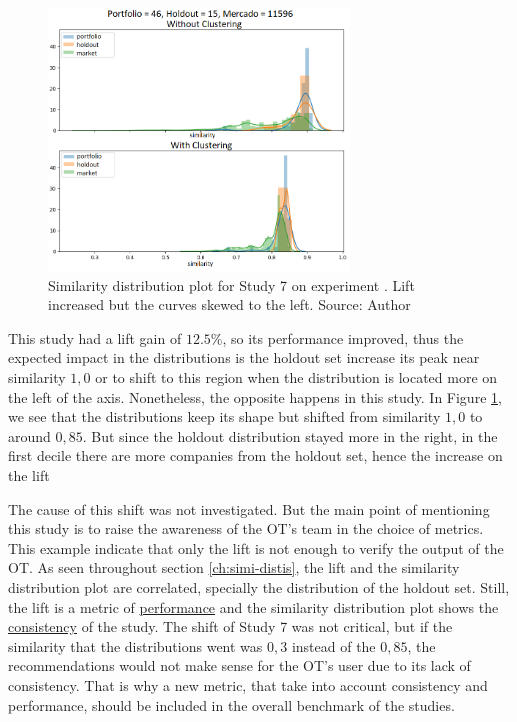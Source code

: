 \begin{figure}[!ht]
   \centering
   \includegraphics[width=8cm]{fig/ch4-worth-mentioning-study-7.png}
   \caption{Similarity distribution plot for Study 7 on experiment \nameExperimentII{}. Lift increased but the curves skewed to the left. Source: Author}
   \label{fig:worth-mentioning-study-7}
\end{figure}

This study had a lift gain of $12.5\%$, so its performance improved, thus the expected impact in the distributions is the holdout set increase its peak near similarity $1,0$ or to shift to this region when the distribution is located more on the left of the axis. Nonetheless, the opposite happens in this study. In Figure \ref{fig:worth-mentioning-study-7}, we see that the distributions keep its shape but shifted from similarity $1,0$ to around $0,85$. But since the holdout distribution stayed more in the right, in the first decile there are more companies from the holdout set, hence the increase on the lift

The cause of this shift was not investigated. But the main point of mentioning this study is to raise the awareness of the OT's team in the choice of metrics. This example indicate that only the lift is not enough to verify the output of the OT. As seen throughout section \ref{ch:simi-distis}, the lift and the similarity distribution plot are correlated, specially the distribution of the holdout set. Still, the lift is a metric of \underline{performance} and the similarity distribution plot shows the \underline{consistency} of the study. The shift of Study 7 was not critical, but if the similarity that the distributions went was $0,3$ instead of the $0,85$, the recommendations would not make sense for the OT's user due to its lack of consistency. That is why a new metric, that take into account consistency and performance, should be included in the overall benchmark of the studies.


